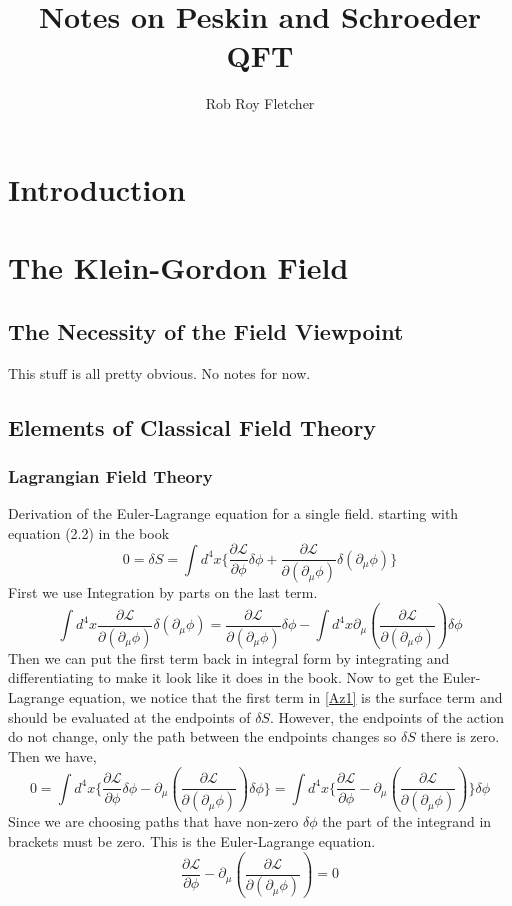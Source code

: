 \documentclass{article}
\title{Notes on Peskin and Schroeder QFT}
\author{Rob Roy Fletcher}
\numberwithin{equation}{section}
\newcommand{\Lagr}{\mathcal{L}}  %
\newcommand{\dmu}{\partial_{\mu}}
\begin{document}
\section{Introduction}
\section{The Klein-Gordon Field}
\subsection{The Necessity of the Field Viewpoint}
This stuff is all pretty obvious. No notes for now.

\subsection{Elements of Classical Field Theory}
\subsubsection{Lagrangian Field Theory}
Derivation of the Euler-Lagrange equation for a single field. starting with equation (2.2) in the book
\begin{equation*}\label{ps2.2}\tag{PS 2.2}
	0=\delta S= \int d^4 x \lbrace \frac{\partial\Lagr}{\partial\phi} \delta\phi + \frac{\partial\Lagr}{\partial\left(\dmu\phi\right)} \delta\left(\dmu\phi\right) \rbrace
\end{equation*}
First we use Integration by parts on the last term.
\begin{equation}\label{Az1}
	\int d^4 x \frac{\partial\Lagr}{\partial\left(\dmu\phi\right)} \delta\left(\dmu\phi\right)
	= \frac{\partial\Lagr}{\partial(\dmu\phi)} \delta\phi - \int d^4 x \dmu\left(\frac{\partial\Lagr}{\partial\left(\dmu\phi\right)}\right) \delta\phi
\end{equation}
Then we can put the first term back in integral form by integrating and differentiating to make it look like it does in the book.
 Now to get the Euler-Lagrange equation, we notice that the first term in \eqref{Az1} is the surface term and should be evaluated
at the endpoints of $\delta S$. However, the endpoints of the action do not change, only the path between the endpoints changes so
$\delta S$ there is zero. Then we have,
\begin{equation}\label{Az2}
	0 = \int d^4 x \lbrace \frac{\partial\Lagr}{\partial\phi} \delta\phi - \dmu\left(\frac{\partial\Lagr}{\partial\left(\dmu\phi\right)}\right) \delta\phi \rbrace
	= \int d^4 x \lbrace \frac{\partial\Lagr}{\partial\phi} - \dmu\left(\frac{\partial\Lagr}{\partial\left(\dmu\phi\right)}\right) \rbrace \delta\phi
\end{equation}
Since we are choosing paths that have non-zero $\delta\phi$ the part of the integrand in brackets must be zero. This is the Euler-Lagrange equation.
\begin{equation}\label{ELeq}
	\frac{\partial\Lagr}{\partial\phi} - \dmu\left(\frac{\partial\Lagr}{\partial\left(\dmu\phi\right)}\right) = 0
\end{equation}
\end{document}

